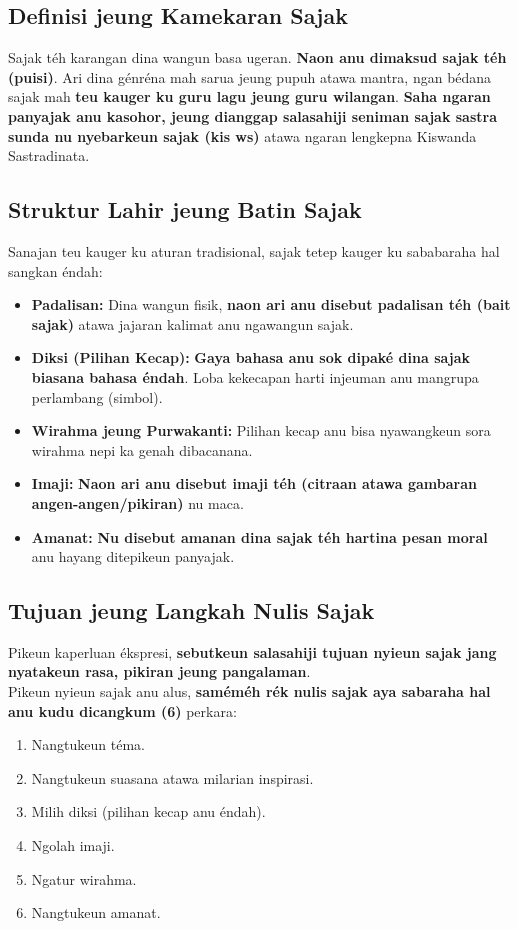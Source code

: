 \documentclass[12pt, a4paper]{article}
\begin{document}
\subsection{Definisi jeung Kamekaran Sajak}
Sajak téh karangan dina wangun basa ugeran. \textbf{Naon anu dimaksud sajak téh (puisi)}. Ari dina génréna mah sarua jeung pupuh atawa mantra, ngan bédana sajak mah \textbf{teu kauger ku guru lagu jeung guru wilangan}. \textbf{Saha ngaran panyajak anu kasohor, jeung dianggap salasahiji seniman sajak sastra sunda nu nyebarkeun sajak (kis ws)} atawa ngaran lengkepna Kiswanda Sastradinata.

\subsection{Struktur Lahir jeung Batin Sajak}
Sanajan teu kauger ku aturan tradisional, sajak tetep kauger ku sababaraha hal sangkan éndah:
\begin{itemize}
    \item \textbf{Padalisan:} Dina wangun fisik, \textbf{naon ari anu disebut padalisan téh (bait sajak)} atawa jajaran kalimat anu ngawangun sajak.
    \item \textbf{Diksi (Pilihan Kecap):} \textbf{Gaya bahasa anu sok dipaké dina sajak biasana bahasa éndah}. Loba kekecapan harti injeuman anu mangrupa perlambang (simbol).
    \item \textbf{Wirahma jeung Purwakanti:} Pilihan kecap anu bisa nyawangkeun sora wirahma nepi ka genah dibacanana.
    \item \textbf{Imaji:} \textbf{Naon ari anu disebut imaji téh (citraan atawa gambaran angen-angen/pikiran)} nu maca.
    \item \textbf{Amanat:} \textbf{Nu disebut amanan dina sajak téh hartina pesan moral} anu hayang ditepikeun panyajak.
\end{itemize}

\subsection{Tujuan jeung Langkah Nulis Sajak}
Pikeun kaperluan ékspresi, \textbf{sebutkeun salasahiji tujuan nyieun sajak jang nyatakeun rasa, pikiran jeung pangalaman}. \\

Pikeun nyieun sajak anu alus, \textbf{saméméh rék nulis sajak aya sabaraha hal anu kudu dicangkum (6)} perkara:
\begin{enumerate}
    \item Nangtukeun téma.
    \item Nangtukeun suasana atawa milarian inspirasi.
    \item Milih diksi (pilihan kecap anu éndah).
    \item Ngolah imaji.
    \item Ngatur wirahma.
    \item Nangtukeun amanat.
\end{enumerate}
\end{document}
